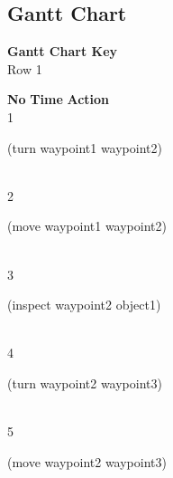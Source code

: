 \documentclass[a4paper,12pt]{article}
\newcommand{\action}[1]{{\sf #1}}
\newcommand{\listrowg}[1]{\begin{minipage}[t]{10cm} #1 \end{minipage}}
\begin{document}
\subsection{Gantt Chart}
{\bf Gantt Chart Key}\\
Row 1
\begin{tabbing}
{\bf No} \qquad \= {\bf Time} \qquad \= {\bf Action} \\
1  \> \listrowg{\action{(turn waypoint1 waypoint2)}} \\
2  \> \listrowg{\action{(move waypoint1 waypoint2)}} \\
3  \> \listrowg{\action{(inspect waypoint2 object1)}} \\
4  \> \listrowg{\action{(turn waypoint2 waypoint3)}} \\
5  \> \listrowg{\action{(move waypoint2 waypoint3)}} \\
\end{tabbing}
\end{document}
